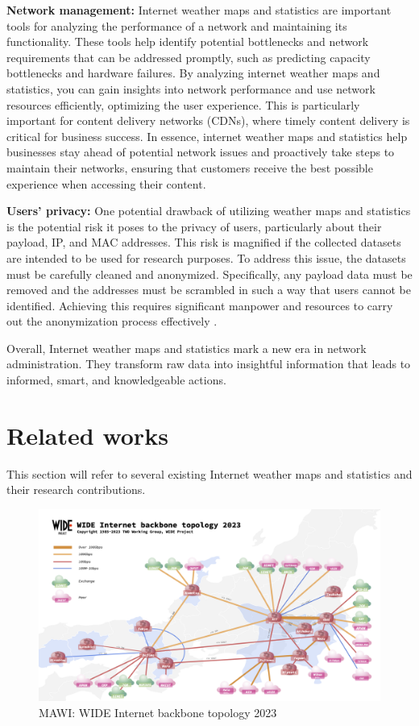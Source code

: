 \documentclass[sigconf,authorversion,nonacm]{acmart}
\begin{document}
\textbf{Network management:} Internet weather maps and statistics are important tools for analyzing the performance of a network and maintaining its functionality. These tools help identify potential bottlenecks and network requirements that can be addressed promptly, such as predicting capacity bottlenecks and hardware failures. By analyzing internet weather maps and statistics, you can gain insights into network performance and use network resources efficiently, optimizing the user experience. This is particularly important for content delivery networks (CDNs), where timely content delivery is critical for business success. In essence, internet weather maps and statistics help businesses stay ahead of potential network issues and proactively take steps to maintain their networks, ensuring that customers receive the best possible experience when accessing their content.

\textbf{Users' privacy:} One potential drawback of utilizing weather maps and statistics is the potential risk it poses to the privacy of users, particularly about their payload, IP, and MAC addresses. This risk is magnified if the collected datasets are intended to be used for research purposes. To address this issue, the datasets must be carefully cleaned and anonymized. Specifically, any payload data must be removed and the addresses must be scrambled in such a way that users cannot be identified. Achieving this requires significant manpower and resources to carry out the anonymization process effectively \cite{271335}.

Overall, Internet weather maps and statistics mark a new era in network administration. They transform raw data into insightful information that leads to informed, smart, and knowledgeable actions.

\section{Related works}
This section will refer to several existing Internet weather maps and statistics and their research contributions.
\begin{figure}
    \centering
    \includegraphics[width=\linewidth]{MAWI/wide topology.png}
    \caption{MAWI: WIDE Internet backbone topology 2023}
    \label{MAWI: WIDE Internet backbone topology 2023}
\end{figure}
\end{document}
